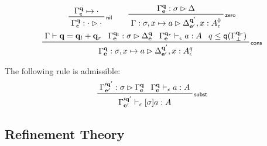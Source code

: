 \documentclass[acmsmall,screen,review]{acmart}
\newcommand{\mb}[1]{\ensuremath{\mathbf{#1}}}
\newcommand{\ms}[1]{\ensuremath{\mathsf{#1}}}
\newcommand{\qsp}[4]{#1 \vdash #2 = #3 + #4}
\newcommand{\cwk}[2]{#1 \mapsto #2}
\newcommand{\rle}[1]{{\scriptsize\textsf{#1}}}
\newcommand{\hasty}[4]{#1 \vdash_{#2} #3: {#4}}
\newcommand{\issubst}[3]{#1: #2 \rhd #3}
\newcommand{\alquant}{\ms{q}}
\begin{document}
\begin{gather*}
  \prftree[r]{\rle{nil}}{\cwk{\Gamma^{\mb{q}}_{\ms{e}}}{\cdot}}
                             {\issubst{\Gamma^{\mb{q}}_{\ms{e}}}{\cdot}{\cdot}} \qquad 
  \prftree[r]{\rle{zero}}
    {\issubst{\Gamma^{\mb{q}}_{\mb{e}}}{\sigma}{\Delta}}
    {\issubst{\Gamma}{\sigma, x \mapsto a}{\Delta^{\mb{q}'}_{\mb{e}'}, x : A^0_\epsilon}}
  \\
  \prftree[r]{\rle{cons}}
    {\qsp{\Gamma}{\mb{q}}{\mb{q}_l}{\mb{q}_r}}
    {\issubst{\Gamma^{\mb{q_l}}_{\mb{e}}}{\sigma}{\Delta^{\mb{q}}_{\mb{e}}}}
    {\hasty{\Gamma^{\mb{q}_r}_{\mb{e}}}{\epsilon}{a}{A}}
    {q \leq \alquant(\Gamma^{\mb{q}_r}_{\bot})}
    {\issubst{\Gamma^{\mb{q}}_{\mb{e}}}{\sigma, x \mapsto a}
    {\Delta^{\mb{q}'}_{\mb{e}'}, x : A^q_\epsilon}}
\end{gather*}

\begin{lemma}[name=Substitution, restate=synmonsubst]
  The following rule is admissible:
  \begin{equation*}
    \prftree[r]{\rle{subst}}
      {\issubst{\Gamma'^{\mb{q}'}_{\mb{e}'}}{\sigma}{\Gamma^{\mb{q}}_{\mb{e}}}}
      {\hasty{\Gamma^{\mb{q}}_{\mb{e}}}{\epsilon}{a}{A}}
      {\hasty{\Gamma'^{\mb{q}'}_{\mb{e}'}}{\epsilon}{[\sigma]a}{A}}
  \end{equation*}
\end{lemma}

\subsection{Refinement Theory}
\end{document}
